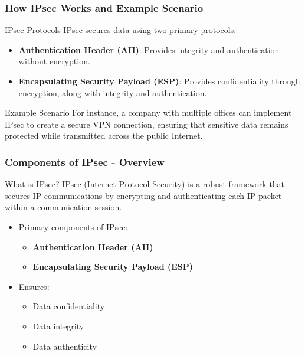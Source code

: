 \documentclass{beamer}
\begin{document}
\begin{frame}[fragile]
    \frametitle{How IPsec Works and Example Scenario}
    \begin{block}{IPsec Protocols}
        IPsec secures data using two primary protocols:
    \end{block}
    \begin{itemize}
        \item \textbf{Authentication Header (AH)}: Provides integrity and authentication without encryption.
        \item \textbf{Encapsulating Security Payload (ESP)}: Provides confidentiality through encryption, along with integrity and authentication.
    \end{itemize}

    \begin{block}{Example Scenario}
        For instance, a company with multiple offices can implement IPsec to create a secure VPN connection, ensuring that sensitive data remains protected while transmitted across the public Internet.
    \end{block}
\end{frame}

\begin{frame}[fragile]
    \frametitle{Components of IPsec - Overview}
    \begin{block}{What is IPsec?}
        IPsec (Internet Protocol Security) is a robust framework that secures IP communications by encrypting and authenticating each IP packet within a communication session.
    \end{block}
    \begin{itemize}
        \item Primary components of IPsec:
            \begin{itemize}
                \item \textbf{Authentication Header (AH)}
                \item \textbf{Encapsulating Security Payload (ESP)}
            \end{itemize}
        \item Ensures:
            \begin{itemize}
                \item Data confidentiality
                \item Data integrity
                \item Data authenticity
            \end{itemize}
    \end{itemize}
\end{frame}
\end{document}
